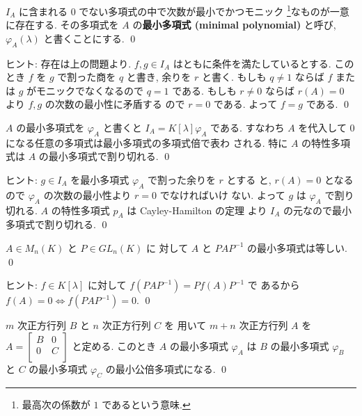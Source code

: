 \documentclass[12pt,twoside]{jarticle}
\begin{document}

\begin{question}[最小多項式の定義]
\label{q:minimal-polyn-2}
  $I_A$ に含まれる $0$ でない多項式の中で次数が最小でかつモニック%
  \footnote{最高次の係数が $1$ であるという意味.}なものが一意に存在する.
  その多項式を $A$ の{\bf 最小多項式 (minimal polynomial)} と呼び,
  $\varphi_A(\lambda)$ と書くことにする.
  \qed
\end{question}

\noindent
ヒント: 存在は上の問題より.  $f,g\in I_A$ はともに条件を満たしているとする.
このとき $f$ を $g$ で割った商を $q$ と書き, 余りを $r$ と書く.
もしも $q\ne 1$ ならば $f$ または $g$ がモニックでなくなるので $q=1$ である.
もしも $r\ne 0$ ならば $r(A)=0$ より $f,g$ の次数の最小性に矛盾する
ので $r=0$ である.  よって $f=g$ である.
\qed


\begin{question}
\label{q:minimal-polyn-3}
  $A$ の最小多項式を $\varphi_A$ と書くと $I_A = K[\lambda]\varphi_A$ である.
  すなわち $A$ を代入して $0$ になる任意の多項式は最小多項式の多項式倍で表わ
  される.  特に $A$ の特性多項式は $A$ の最小多項式で割り切れる.
  \qed
\end{question}

\noindent
ヒント: $g\in I_A$ を最小多項式 $\varphi_A$ で割った余りを $r$ とする
と, $r(A)=0$ となるので $\varphi_A$ の次数の最小性より $r=0$ でなければいけ
ない.  よって $g$ は $\varphi_A$ で割り切れる. 
$A$ の特性多項式 $p_A$ は Cayley-Hamilton の定理
より $I_A$ の元なので最小多項式で割り切れる.
\qed


\begin{question}
\label{q:minimal-polyn-4}
  $A\in M_n(K)$ と $P\in GL_n(K)$ に
  対して $A$ と $PAP^{-1}$ の最小多項式は等しい. \qed
\end{question}

\noindent
ヒント: $f\in K[\lambda]$ に対して $f(PAP^{-1})=Pf(A)P^{-1}$ で
あるから $f(A)=0 \iff f(PAP^{-1})=0$.
\qed


\begin{question}
\label{q:minimal-polyn-8}
  $m$ 次正方行列 $B$ と $n$ 次正方行列 $C$ を
  用いて $m+n$ 次正方行列 $A$ を $A =
  \begin{bmatrix}
    B & 0 \\
    0 & C \\
  \end{bmatrix}$ と定める.  
  このとき $A$ の最小多項式 $\varphi_A$ 
  は $B$ の最小多項式 $\varphi_B$ と $C$ の最小多項式 $\varphi_C$ 
  の最小公倍多項式になる.
  \qed
\end{question}
\end{document}
